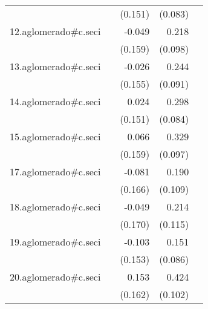 {\begin{longtable}{l*{4}{D{.}{.}{-1}}}
            &                     &     (0.151)         &     (0.083)         &                     \\
\addlinespace
12.aglomerado#c.seci&                     &      -0.049         &       0.218\sym{*}  &                     \\
            &                     &     (0.159)         &     (0.098)         &                     \\
\addlinespace
13.aglomerado#c.seci&                     &      -0.026         &       0.244\sym{**} &                     \\
            &                     &     (0.155)         &     (0.091)         &                     \\
\addlinespace
14.aglomerado#c.seci&                     &       0.024         &       0.298\sym{***}&                     \\
            &                     &     (0.151)         &     (0.084)         &                     \\
\addlinespace
15.aglomerado#c.seci&                     &       0.066         &       0.329\sym{***}&                     \\
            &                     &     (0.159)         &     (0.097)         &                     \\
\addlinespace
17.aglomerado#c.seci&                     &      -0.081         &       0.190         &                     \\
            &                     &     (0.166)         &     (0.109)         &                     \\
\addlinespace
18.aglomerado#c.seci&                     &      -0.049         &       0.214         &                     \\
            &                     &     (0.170)         &     (0.115)         &                     \\
\addlinespace
19.aglomerado#c.seci&                     &      -0.103         &       0.151         &                     \\
            &                     &     (0.153)         &     (0.086)         &                     \\
\addlinespace
20.aglomerado#c.seci&                     &       0.153         &       0.424\sym{***}&                     \\
            &                     &     (0.162)         &     (0.102)         &                     \\

\end{longtable}}
